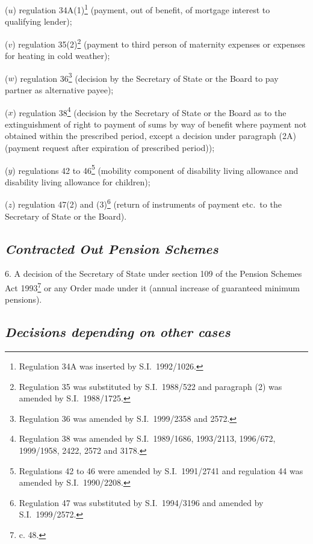 \documentclass[12pt,a4paper]{article}
\begin{document}
\begin{enumerate}
($u$) regulation 34A(1)\footnote{Regulation 34A was inserted by S.I.\ 1992/1026.} (payment, out of benefit, of mortgage interest to qualifying lender);

($v$) regulation 35(2)\footnote{Regulation 35 was substituted by S.I.\ 1988/522 and paragraph (2) was amended by S.I.\ 1988/1725.} (payment to third person of maternity expenses or expenses for heating in cold weather);

($w$) regulation 36\footnote{Regulation 36 was amended by S.I.\ 1999/2358 and 2572.} (decision by the Secretary of State or the Board to pay partner as alternative payee);

($x$) regulation 38\footnote{Regulation 38 was amended by S.I.\ 1989/1686, 1993/2113, 1996/672, 1999/1958, 2422, 2572 and 3178.} (decision by the Secretary of State or the Board as to the extinguishment of right to payment of sums by way of benefit where payment not obtained within the prescribed period, except a decision under paragraph (2A) (payment request after expiration of prescribed period));

($y$) regulations 42 to 46\footnote{Regulations 42 to 46 were amended by S.I.\ 1991/2741 and regulation 44 was amended by S.I.\ 1990/2208.} (mobility component of disability living allowance and disability living allowance for children);

($z$) regulation 47(2) and (3)\footnote{Regulation 47 was substituted by S.I.\ 1994/3196 and amended by S.I.\ 1999/2572.} (return of instruments of payment etc.\ to the Secretary of State or the Board).
\end{enumerate}


\subsection*{\itshape Contracted Out Pension Schemes}

6.  A decision of the Secretary of State under section 109 of the Pension Schemes Act 1993\footnote{ c. 48.} or any Order made under it (annual increase of guaranteed minimum pensions).

\subsection*{\itshape Decisions depending on other cases}
\end{document}
